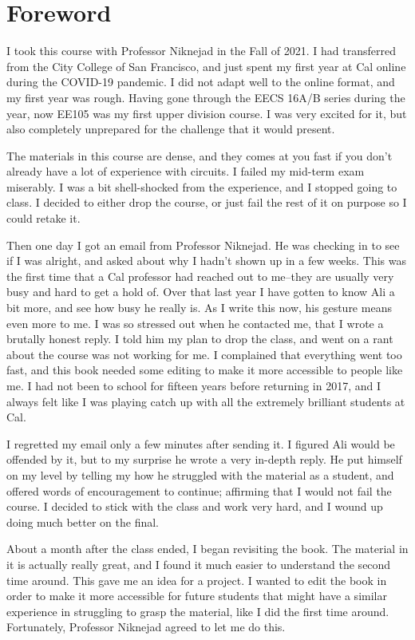 \section*{Foreword}
I took this course with Professor Niknejad in the Fall of 2021.  I had transferred from the City College of San Francisco, and just spent my first year at Cal online during the COVID-19 pandemic.  I did not adapt well to the online format, and my first year was rough.  Having gone through the EECS 16A/B series during the year, now EE105 was my first upper division course.  I was very excited for it, but also completely unprepared for the challenge that it would present.

The materials in this course are dense, and they comes at you fast if you don't already have a lot of experience with circuits.  I failed my mid-term exam miserably.  I was a bit shell-shocked from the experience, and I stopped going to class.  I decided to either drop the course, or just fail the rest of it on purpose so I could retake it.

Then one day I got an email from Professor Niknejad.  He was checking in to see if I was alright, and asked about why I hadn't shown up in a few weeks.  This was the first time that a Cal professor had reached out to me--they are usually very busy and hard to get a hold of.  Over that last year I have gotten to know Ali a bit more, and see how busy he really is.  As I write this now, his gesture means even more to me.  I was so stressed out when he contacted me, that I wrote a brutally honest reply.  I told him my plan to drop the class, and went on a rant about the course was not working for me.  I complained that everything went too fast, and this book needed some editing to make it more accessible to people like me.  I had not been to school for fifteen years before returning in 2017, and I always felt like I was playing catch up with all the extremely brilliant students at Cal.

I regretted my email only a few minutes after sending it.  I figured Ali would be offended by it, but to my surprise he wrote a very in-depth reply.  He put himself on my level by telling my how he struggled with the material as a student, and offered words of encouragement to continue; affirming that I would not fail the course.  I decided to stick with the class and work very hard, and I wound up doing much better on the final.

About a month after the class ended, I began revisiting the book.  The material in it is actually really great, and I found it much easier to understand the second time around.  This gave me an idea for a project.  I wanted to edit the book in order to make it more accessible for future students that might have a similar experience in struggling to grasp the material, like I did the first time around.  Fortunately, Professor Niknejad agreed to let me do this.

